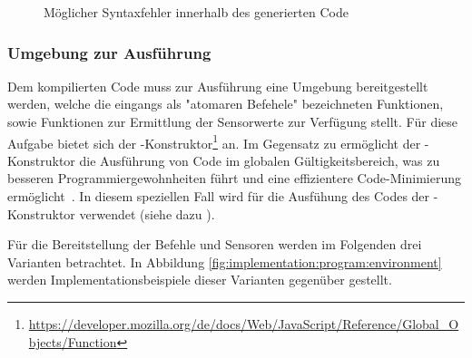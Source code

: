 \begin{figure}
  
  \caption{Möglicher Syntaxfehler innerhalb des generierten Code}
  \label{fig:implementation:program:evaluation:try-catch}
\end{figure}

\subsubsection{Umgebung zur Ausführung}

Dem kompilierten Code muss zur Ausführung eine Umgebung bereitgestellt werden, welche die eingangs als "atomaren Befehele" bezeichneten Funktionen, sowie Funktionen zur Ermittlung der Sensorwerte zur Verfügung stellt. Für diese Aufgabe bietet sich der -Konstruktor\footnote{\url{https://developer.mozilla.org/de/docs/Web/JavaScript/Reference/Global_Objects/Function}} an. Im Gegensatz zu  ermöglicht der -Konstruktor die Ausführung von Code im globalen Gültigkeitsbereich, was zu besseren Programmiergewohnheiten führt und eine effizientere Code-Minimierung ermöglicht~\cite{mdn-function}. In diesem speziellen Fall wird für die Ausfühung des Codes der -Konstruktor verwendet (siehe dazu ).

Für die Bereitstellung der Befehle und Sensoren werden im Folgenden drei Varianten betrachtet. In Abbildung \ref{fig:implementation:program:environment} werden Implementationsbeispiele dieser Varianten gegenüber gestellt.

